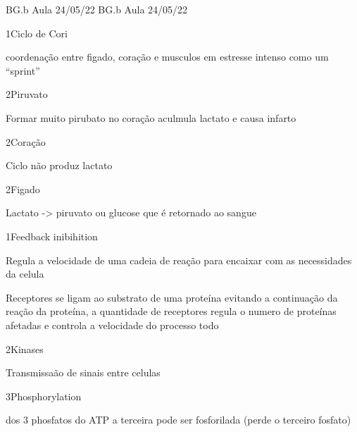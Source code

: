 \documentclass[\mainfilename]{subfiles}
\begin{document}
{BG.b Aula 24/05/22}
{BG.b Aula 24/05/22}

\begin{sectionBox}1{Ciclo de Cori}
    
    coordenação entre figado, coração e musculos em estresse intenso como um ``sprint''
    
    \begin{multicols}{2}
    
        \begin{sectionBox}2{Piruvato}
            
            Formar muito pirubato no coração aculmula lactato e causa infarto
            
        \end{sectionBox}
    
        \begin{sectionBox}2{Coração}
            
            Ciclo não produz lactato
            
        \end{sectionBox}
    
        \begin{sectionBox}2{Figado}
            
            Lactato -> piruvato ou glucose que é retornado ao sangue
            
        \end{sectionBox}

    \end{multicols}

\end{sectionBox}    


\begin{sectionBox}1{Feedback inibihition}
    
    Regula a velocidade de uma cadeia de reação para encaixar com as necessidades da celula

    Receptores se ligam ao substrato de uma proteína evitando a continuação da reação da proteína, a quantidade de receptores regula o numero de proteínas afetadas e controla a velocidade do processo todo

    \begin{sectionBox}2{Kinases}
        
        Transmissaão de sinais entre celulas
    
        \begin{sectionBox}3{Phosphorylation}
            
            dos 3 phosfatos do ATP a terceira pode ser fosforilada (perde o terceiro fosfato)
            
        \end{sectionBox}
        
    \end{sectionBox}
    
\end{sectionBox}
\end{document}

